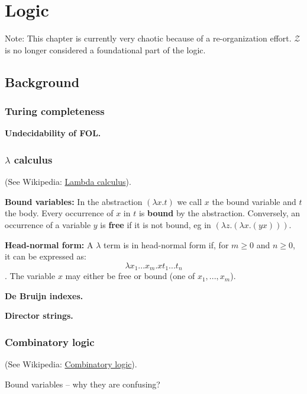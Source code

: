 \chapter{Logic}
\minitoc

Note:  This chapter is currently very chaotic because of a re-organization effort.  $\mathcal{Z}$ is no longer considered a foundational part of the logic.

\section{Background}

\subsection{Turing completeness}

\textbf{Undecidability of FOL.}

\subsection{$\lambda$ calculus}

(See Wikipedia: \href{http://en.wikipedia.org/wiki/Lambda_calculus}{Lambda calculus}).

\textbf{Bound variables:}  In the abstraction $(\lambda x.t)$ we call $x$ the bound variable and $t$ the body.  Every occurrence of $x$ in $t$ is \textbf{bound} by the abstraction.  Conversely, an occurrence of a variable $y$ is \textbf{free} if it is not bound, eg in $(\lambda z.(\lambda x.(yx)))$.

\textbf{Head-normal form:}  A $\lambda$ term is in head-normal form if, for $m \geq 0$ and $n \geq 0$, it can be expressed as:
$$\lambda x_1 ... x_m . x t_1 ... t_n$$.
The variable $x$ may either be free or bound (one of $x_1,...,x_m$).

\textbf{De Bruijn indexes.}

\textbf{Director strings.}

\subsection{Combinatory logic}

(See Wikipedia: \href{http://en.wikipedia.org/wiki/Combinatory_logic}{Combinatory logic}).

Bound variables -- why they are confusing?


